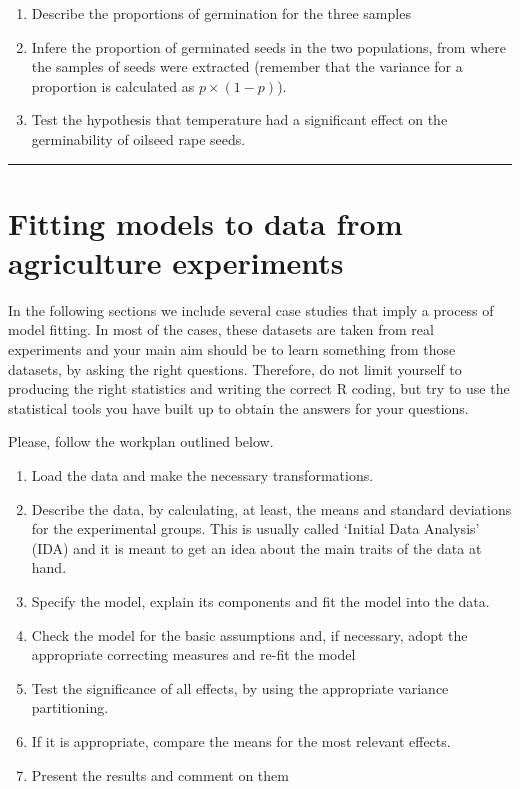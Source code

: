 \documentclass[a4paper,12pt,oneside]{book}
\providecommand{\tightlist}{%
  \setlength{\itemsep}{0pt}\setlength{\parskip}{0pt}}
\begin{document}
\begin{enumerate}
\def\labelenumi{\arabic{enumi}.}
\tightlist
\item
  Describe the proportions of germination for the three samples
\item
  Infere the proportion of germinated seeds in the two populations, from where the samples of seeds were extracted (remember that the variance for a proportion is calculated as \(p \times (1- p)\)).
\item
  Test the hypothesis that temperature had a significant effect on the germinability of oilseed rape seeds.
\end{enumerate}

\begin{center}\rule{0.5\linewidth}{0.5pt}\end{center}

\hypertarget{fitting-models-to-data-from-agriculture-experiments}{%
\section{Fitting models to data from agriculture experiments}\label{fitting-models-to-data-from-agriculture-experiments}}

In the following sections we include several case studies that imply a process of model fitting. In most of the cases, these datasets are taken from real experiments and your main aim should be to learn something from those datasets, by asking the right questions. Therefore, do not limit yourself to producing the right statistics and writing the correct R coding, but try to use the statistical tools you have built up to obtain the answers for your questions.

Please, follow the workplan outlined below.

\begin{enumerate}
\def\labelenumi{\arabic{enumi}.}
\tightlist
\item
  Load the data and make the necessary transformations.
\item
  Describe the data, by calculating, at least, the means and standard deviations for the experimental groups. This is usually called `Initial Data Analysis' (IDA) and it is meant to get an idea about the main traits of the data at hand.
\item
  Specify the model, explain its components and fit the model into the data.
\item
  Check the model for the basic assumptions and, if necessary, adopt the appropriate correcting measures and re-fit the model
\item
  Test the significance of all effects, by using the appropriate variance partitioning.
\item
  If it is appropriate, compare the means for the most relevant effects.
\item
  Present the results and comment on them
\end{enumerate}
\end{document}
